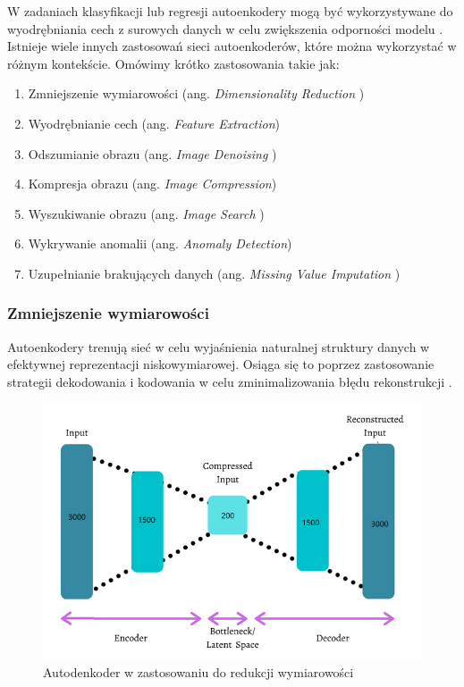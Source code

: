 \documentclass[12pt]{mwbk}
\theoremstyle{plain}
\theoremstyle{definition}
\theoremstyle{remark}
\newcommand\zrodlo[1]{\par\vspace{-3mm}{\small\textit{Źródło: }#1 }}
\begin{document}
W zadaniach klasyfikacji lub regresji autoenkodery mogą być wykorzystywane do wyodrębniania cech z surowych danych w celu zwiększenia odporności modelu \cite{kumar}. Istnieje wiele innych zastosowań sieci autoenkoderów, które można wykorzystać w różnym kontekście. Omówimy krótko zastosowania takie jak:
\begin{enumerate}
\item  Zmniejszenie wymiarowości (ang. \emph{Dimensionality Reduction })

\item  Wyodrębnianie cech (ang. \emph{Feature Extraction})

\item  Odszumianie obrazu (ang. \emph{Image Denoising })

\item  Kompresja obrazu (ang. \emph{Image Compression})

\item Wyszukiwanie obrazu (ang. \emph{ Image Search })

\item Wykrywanie anomalii (ang. \emph{ Anomaly Detection})

\item  Uzupełnianie brakujących danych (ang. \emph{Missing Value Imputation })

\end{enumerate}

\subsubsection{Zmniejszenie wymiarowości}


Autoenkodery trenują sieć w celu wyjaśnienia naturalnej struktury danych w efektywnej reprezentacji niskowymiarowej. Osiąga się to poprzez zastosowanie strategii dekodowania i kodowania w celu zminimalizowania błędu rekonstrukcji \cite{kumar}.



\begin{figure}[!h]
	\centering
	\includegraphics[width=0.8\linewidth]{rys/dimensionality_reduction.png}
	\caption{Autodenkoder w zastosowaniu do redukcji wymiarowości}
	\zrodlo{\cite{kumar}}
	\label{fig:dimensionality-reduction}
\end{figure}
\end{document}
